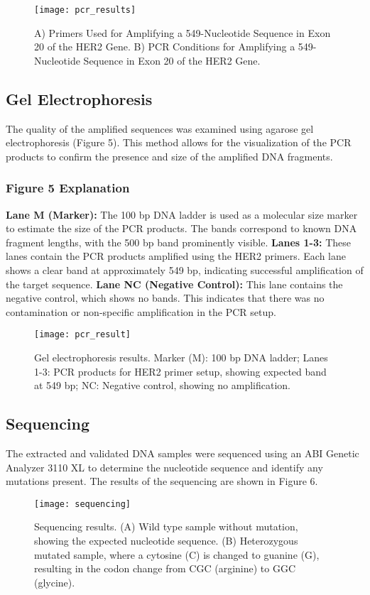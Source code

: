 \documentclass[12pt]{article}
\begin{document}
\begin{figure}[h]
\centering
\texttt{[image: pcr\_results]}\\
\caption{A) Primers Used for Amplifying a 549-Nucleotide Sequence in Exon 20 of the HER2 Gene. B) PCR Conditions for Amplifying a 549-Nucleotide Sequence in Exon 20 of the HER2 Gene.}
\end{figure}


\subsection{Gel Electrophoresis}
The quality of the amplified sequences was examined using agarose gel electrophoresis (Figure 5). This method allows for the visualization of the PCR products to confirm the presence and size of the amplified DNA fragments.

\subsubsection{Figure 5 Explanation}
\textbf{Lane M (Marker):} The 100 bp DNA ladder is used as a molecular size marker to estimate the size of the PCR products. The bands correspond to known DNA fragment lengths, with the 500 bp band prominently visible.
\textbf{Lanes 1-3:} These lanes contain the PCR products amplified using the HER2 primers. Each lane shows a clear band at approximately 549 bp, indicating successful amplification of the target sequence.
\textbf{Lane NC (Negative Control):} This lane contains the negative control, which shows no bands. This indicates that there was no contamination or non-specific amplification in the PCR setup.

\begin{figure}[h]
\centering
\texttt{[image: pcr\_result]}
\caption{Gel electrophoresis results. Marker (M): 100 bp DNA ladder; Lanes 1-3: PCR products for HER2 primer setup, showing expected band at 549 bp; NC: Negative control, showing no amplification.}
\end{figure}


\subsection{Sequencing}
The extracted and validated DNA samples were sequenced using an ABI Genetic Analyzer 3110 XL to determine the nucleotide sequence and identify any mutations present. The results of the sequencing are shown in Figure 6.

\begin{figure}[h]
\centering
\texttt{[image: sequencing]}
\caption{Sequencing results. (A) Wild type sample without mutation, showing the expected nucleotide sequence. (B) Heterozygous mutated sample, where a cytosine (C) is changed to guanine (G), resulting in the codon change from CGC (arginine) to GGC (glycine).}
\end{figure}
\end{document}
